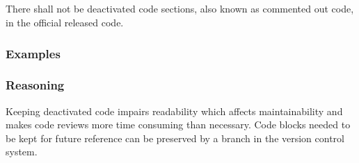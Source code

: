 \subsection*{\codingRule{}}

There shall not be deactivated code sections, also known as commented out code, in the official released code.

\subsubsection*{Examples}

\noindent
\begin{minipage}[t]{\codelstwidth\linewidth}
    
\end{minipage}
\hfill
\begin{minipage}[t]{\codelstwidth\linewidth}
    
\end{minipage}

\subsubsection*{Reasoning}

Keeping deactivated code impairs readability which affects maintainability and makes code reviews more time consuming than necessary.
Code blocks needed to be kept for future reference can be preserved by a branch in the version control system.
